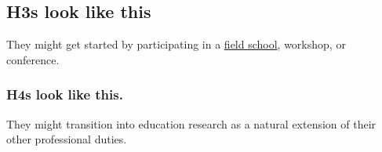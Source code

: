 \documentclass[
  letterpaper,
]{report}
\begin{document}
\subsection{H3s look like this}\label{h3s-look-like-this}

They might get started by participating in a
\href{https://peerinstitute.org/}{field school}, workshop, or
conference.

\subsubsection{H4s look like this.}\label{h4s-look-like-this.}

They might transition into education research as a natural extension of
their other professional duties.
\end{document}
